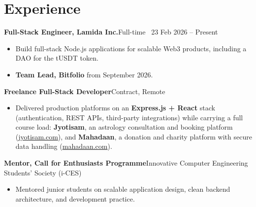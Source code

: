 \documentclass[a4paper,10pt]{article}
\newcommand{\entry}[2]{\textbf{#1}\hfill{\color{rulegray}\small #2}\par\vspace{1pt}}
\begin{document}
\section*{Experience}

\entry{Full-Stack Engineer, Lamida Inc.}{Full-time \textbar\ 23 Feb 2026 -- Present}
\begin{itemize}
\item Build full-stack Node.js applications for scalable Web3 products, including a DAO for the tUSDT token.
\item \textbf{Team Lead, Bitfolio} from September 2026.
\end{itemize}

\entry{Freelance Full-Stack Developer}{Contract, Remote}
\begin{itemize}
\item Delivered production platforms on an \textbf{Express.js + React} stack (authentication, REST APIs, third-party integrations) while carrying a full course load: \textbf{Jyotisam}, an astrology consultation and booking platform (\href{https://jyotisam.com}{jyotisam.com}), and \textbf{Mahadaan}, a donation and charity platform with secure data handling (\href{https://mahadaan.com}{mahadaan.com}).
\end{itemize}

\entry{Mentor, Call for Enthusiasts Programme}{Innovative Computer Engineering Students' Society (i-CES)}
\begin{itemize}
\item Mentored junior students on scalable application design, clean backend architecture, and development practice.
\end{itemize}
\end{document}
